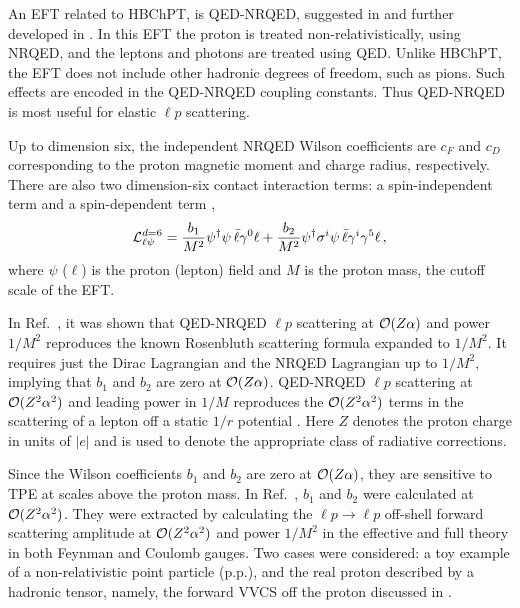An EFT related to HBChPT, is QED-NRQED, suggested in \cite{Caswell:1985ui,Pineda:1997bj,Pineda:1998kj,Hill:2012rh} and further developed in \cite{Dye:2016uep,Dye:2018rgg,Peset:2014jxa}. In this EFT the proton is treated non-relativistically, using NRQED, and the leptons and photons are treated using QED. Unlike HBChPT, the EFT does not include other hadronic degrees of freedom, such as pions. Such effects are encoded in the QED-NRQED coupling constants. Thus QED-NRQED is most useful for elastic $\ell p$ scattering.  

Up to dimension six, the independent NRQED Wilson coefficients are $c_F$ and $c_D$ corresponding to the proton magnetic moment and charge radius, respectively. There are also two dimension-six contact interaction terms: a spin-independent term and a spin-dependent term \cite{Hill:2012rh}, 
\begin{equation}
{\cal L}_{\ell\psi}^{d=6}=\dfrac{b_1}{M^2}\psi^\dagger\psi\,\bar \ell\gamma^0\ell+\dfrac{b_2}{M^2}\psi^\dagger\sigma^i\psi\,\bar \ell\gamma^i\gamma^5\ell\,,
\end{equation}
where $\psi$ ($\ell$) is the proton (lepton) field and $M$ is the proton mass, the cutoff scale of the EFT. 

In Ref.~\cite{Dye:2016uep}, it was shown that QED-NRQED $\ell p$ scattering at ${\cal O}(Z\alpha)$ and power $1/M^2$  reproduces the known Rosenbluth scattering formula expanded to $1/M^2$. It requires just the Dirac Lagrangian and the NRQED Lagrangian up to $1/M^2$, implying that $b_1$ and $b_2$ are zero at ${\cal O}(Z\alpha)$. QED-NRQED $\ell p$ scattering at ${\cal O}(Z^2\alpha^2)$ and leading power in $1/M$ reproduces the ${\cal O}(Z^2\alpha^2)$ terms in the scattering of a lepton off a static $1/r$ potential \cite{Dalitz:1951ah}. Here $Z$ denotes the proton charge in units of $|e|$ and is used to denote the appropriate class of radiative corrections.  



Since the Wilson coefficients $b_1$ and $b_2$ are zero at ${\cal O}(Z\alpha)$, they are sensitive to TPE at scales above the proton mass. In Ref.~\cite{Dye:2018rgg}, $b_1$ and $b_2$ were calculated at ${\cal O}(Z^2\alpha^2)$. They were extracted by calculating the $\ell p\to\ell p$ off-shell  forward scattering amplitude at ${\cal O}(Z^2\alpha^2)$ and power $1/M^2$ in the effective and full theory  in both Feynman and Coulomb gauges. Two cases were considered:  a toy example of a non-relativistic point particle (p.p.), and the real proton described by a hadronic tensor, namely, the forward VVCS off the proton discussed in .


